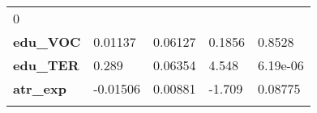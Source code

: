 \documentclass[]{article}
\begin{document}
\begin{longtable}[]{@{}lllll@{}}
\begin{minipage}[t]{0.13\columnwidth}
0\strut
\end{minipage}\tabularnewline
\begin{minipage}[t]{0.23\columnwidth}\raggedright
\textbf{edu\_VOC}\strut
\end{minipage} & \begin{minipage}[t]{0.14\columnwidth}\raggedright
0.01137\strut
\end{minipage} & \begin{minipage}[t]{0.16\columnwidth}\raggedright
0.06127\strut
\end{minipage} & \begin{minipage}[t]{0.12\columnwidth}\raggedright
0.1856\strut
\end{minipage} & \begin{minipage}[t]{0.13\columnwidth}\raggedright
0.8528\strut
\end{minipage}\tabularnewline
\begin{minipage}[t]{0.23\columnwidth}\raggedright
\textbf{edu\_TER}\strut
\end{minipage} & \begin{minipage}[t]{0.14\columnwidth}\raggedright
0.289\strut
\end{minipage} & \begin{minipage}[t]{0.16\columnwidth}\raggedright
0.06354\strut
\end{minipage} & \begin{minipage}[t]{0.12\columnwidth}\raggedright
4.548\strut
\end{minipage} & \begin{minipage}[t]{0.13\columnwidth}\raggedright
6.19e-06\strut
\end{minipage}\tabularnewline
\begin{minipage}[t]{0.23\columnwidth}\raggedright
\textbf{atr\_exp}\strut
\end{minipage} & \begin{minipage}[t]{0.14\columnwidth}\raggedright
-0.01506\strut
\end{minipage} & \begin{minipage}[t]{0.16\columnwidth}\raggedright
0.00881\strut
\end{minipage} & \begin{minipage}[t]{0.12\columnwidth}\raggedright
-1.709\strut
\end{minipage} & \begin{minipage}[t]{0.13\columnwidth}\raggedright
0.08775\strut
\end{minipage}\tabularnewline
\begin{minipage}[t]{0.23\columnwidth}\raggedright

\end{minipage}
\end{longtable}
\end{document}
